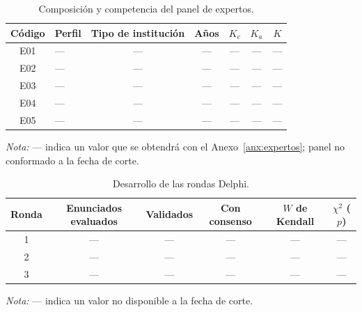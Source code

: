 \begin{table}[htbp]
  \centering
  \caption{Composición y competencia del panel de expertos.}
  \label{tab:panel_resultados}
  \footnotesize
  \renewcommand{\arraystretch}{1.2}
  \begin{tabular}{|c|l|c|c|c|c|c|}
    \hline
    \textbf{Código} & \textbf{Perfil} & \textbf{Tipo de institución} & \textbf{Años} & \textbf{$K_c$} & \textbf{$K_a$} & \textbf{$K$} \\
    \hline
    E01 & --- & --- & --- & --- & --- & --- \\ \hline
    E02 & --- & --- & --- & --- & --- & --- \\ \hline
    E03 & --- & --- & --- & --- & --- & --- \\ \hline
    E04 & --- & --- & --- & --- & --- & --- \\ \hline
    E05 & --- & --- & --- & --- & --- & --- \\ \hline
  \end{tabular}
  \par\vspace{2pt}
  \raggedright
  \textit{Nota:} --- indica un valor que se obtendrá con el Anexo~\ref{anx:expertos}; panel no conformado a la fecha de corte.
  \par\vspace{2pt}
\end{table}

\begin{table}[htbp]
  \centering
  \caption{Desarrollo de las rondas Delphi.}
  \label{tab:delphi_rondas}
  \footnotesize
  \renewcommand{\arraystretch}{1.2}
  \begin{tabular}{|c|c|c|c|c|c|}
    \hline
    \textbf{Ronda} & \textbf{Enunciados evaluados} & \textbf{Validados} & \textbf{Con consenso} & \textbf{$W$ de Kendall} & \textbf{$\chi^2$ ($p$)} \\
    \hline
    1 & --- & --- & --- & --- & --- \\ \hline
    2 & --- & --- & --- & --- & --- \\ \hline
    3 & --- & --- & --- & --- & --- \\ \hline
  \end{tabular}
  \par\vspace{2pt}
  \raggedright
  \textit{Nota:} --- indica un valor no disponible a la fecha de corte.
  \par\vspace{2pt}
\end{table}

